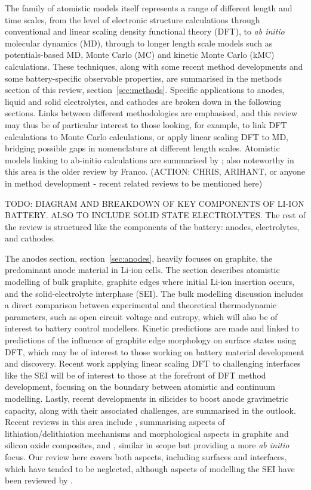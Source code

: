 \documentclass[../main.tex]{subfiles}
\begin{document}
The family of atomistic models itself represents a range of different length and time scales, from the level of electronic structure calculations through conventional and linear scaling density functional theory (DFT), to \textit{ab initio} molecular dynamics (MD), through to longer length scale models such as potentials-based MD, Monte Carlo (MC) and kinetic Monte Carlo (kMC) calculations. These techniques, along with some recent method developments and some battery-specific observable properties, are summarised in the methods section of this review, section~\ref{sec:methods}. Specific applications to anodes, liquid and solid electrolytes, and cathodes are broken down in the following sections. Links between different methodologies are emphasised, and this review may thus be of particular interest to those looking, for example, to link DFT calculations to Monte Carlo calculations, or apply linear scaling DFT to MD, bridging possible gaps in nomenclature at different length scales. Atomistic models linking to ab-initio calculations are summarised by \citeauthor{VanderVen2020} \cite{VanderVen2020}; also noteworthy in this area is the older review by Franco. \citeauthor{franco2013multiscale} (ACTION: CHRIS, ARIHANT, or anyone in method development - recent related reviews to be mentioned here)

TODO: DIAGRAM AND BREAKDOWN OF KEY COMPONENTS OF LI-ION BATTERY. ALSO TO INCLUDE SOLID STATE ELECTROLYTES. The rest of the review is structured like the components of the battery: anodes, electrolytes, and cathodes.

The anodes section, section~\ref{sec:anodes}, heavily focuses on graphite, the predominant anode material in Li-ion cells. The section describes atomistic modelling of bulk graphite, graphite edges where initial Li-ion insertion occurs, and the solid-electrolyte interphase (SEI). The bulk modelling discussion includes a direct comparison between experimental and theoretical thermodynamic parameters, such as  open circuit voltage and entropy, which will also be of interest to battery control modellers. Kinetic predictions are made and linked to predictions of the influence of graphite edge morphology on surface states using DFT, which may be of interest to those working on battery material development and discovery. Recent work applying linear scaling DFT to challenging interfaces like the SEI will be of interest to those at the forefront of DFT method development, focusing on the boundary between atomistic and continuum modelling. Lastly, recent developments in silicides to boost anode gravimetric capacity, along with their associated challenges, are summarised in the outlook. Recent reviews in this area include \citeauthor{asenbauer_success_2020} \cite{asenbauer_success_2020}, summarising aspects of lithiation/delithiation mechanisms and morphological aspects in graphite and silicon oxide composites, and \citeauthor{ZHANG2021147} \cite{ZHANG2021147}, similar in scope but providing a more \textit{ab initio} focus. Our review here covers both aspects, including surfaces and interfaces, which have tended to be neglected, although aspects of modelling the SEI have been reviewed by \citeauthor{Wang2018} \cite{Wang2018}.
\end{document}
